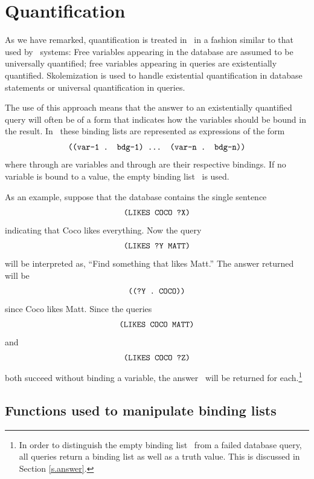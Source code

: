 \section{Quantification}

As we have remarked, quantification is treated in \mvl\ in a fashion
similar to that used by \prolog\ systems:  Free variables appearing
in the database are assumed to be universally quantified; free variables
appearing in queries are existentially quantified.  Skolemization is
used to handle existential quantification in database statements or
universal quantification in queries.

The use of this approach means that the answer to an existentially
quantified query will often be of a form that indicates how the
variables should be bound in the result.  In \mvl\, these binding
lists  are represented as expressions of the
form
 \[\mbox{\tt ((var-1 . bdg-1) ... (var-n . bdg-n))}\]
 where  through  are variables and
 through  are their respective bindings.
If no variable is bound to a value, the empty binding list \NIL\
is used.

As an example, suppose that the database contains the single sentence
 \[\mbox{\tt (LIKES COCO ?X)}\]
 indicating that Coco likes everything.  Now the query
 \[\mbox{\tt (LIKES ?Y MATT)}\]
 will be interpreted as, ``Find something that likes Matt.''  The answer
returned will be
 \[\mbox{\tt ((?Y . COCO))}\]
since Coco likes Matt.  Since the queries
 \[\mbox{\tt (LIKES COCO MATT)}\]
and
 \[\mbox{\tt (LIKES COCO ?Z)}\]
 both succeed without binding a variable, the answer \NIL\ will be
returned for each.\footnote{In order to distinguish the empty binding
list \NIL\ from a failed database query, all queries return a binding
list as well as a truth value.  This is discussed in Section
\ref{s.answer}.}

\subsection{Functions used to manipulate binding lists}

